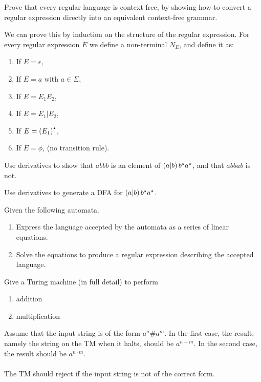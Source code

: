 \documentclass{article}
\begin{document}
\begin{exercise}
Prove that every regular language is context free, by showing how to convert a regular expression directly into an equivalent context-free grammar.
\begin{answer}
We can prove this by induction on the structure of the regular expression. For every regular expression $E$ we define a non-terminal $N_E$, and define it as:
\begin{enumerate}
 \item If $E=\epsilon$, 
 \item If $E=a$ with $a\in\Sigma$, 
 \item If $E=E_1E_2$, 
 \item If $E=E_1|E_2$, 
 \item If $E=\left( E_1 \right)^{\star}$, 
 \item If $E=\phi$,  (no transition rule).
\end{enumerate}
\end{answer}
\end{exercise}

\begin{exercise}
Use derivatives to show that $abbb$ is an element of $\left( a|b \right)b^{\star}a^{\star}$, and that $abbab$ is not.
\end{exercise}

\begin{exercise}
Use derivatives to generate a DFA for $\left( a|b \right)b^{\star}a^{\star}$.
\end{exercise}

\begin{exercise}
Given the following automata.


\begin{enumerate}
 \item Express the language accepted by the automata as a series of linear equations.
 \item Solve the equations to produce a regular expression describing the accepted language.
\end{enumerate}
\end{exercise}

\begin{exercise}
Give a Turing machine (in full detail) to perform
\begin{enumerate}
 \item addition
 \item multiplication
\end{enumerate}
Assume that the input string is of the form $a^n\#a^m$. In the first case, the result, namely the string on the TM when it halts, should be $a^{n+m}$. In the second case, the result should be $a^{n\cdot m}$.
\paragraph{}
The TM should reject if the input string is not of the correct form.
\end{exercise}
\end{document}
